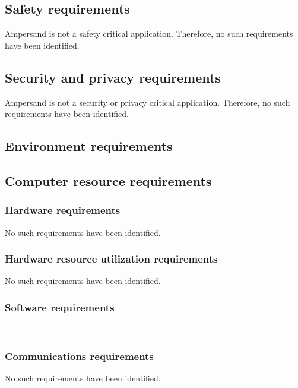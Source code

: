 \subsection{Safety requirements}
Ampersand is not a safety critical application.
Therefore, no such requirements have been identified.

\subsection{Security and privacy requirements}
Ampersand is not a security or privacy critical application.
Therefore, no such requirements have been identified.

\subsection{Environment requirements}

\subsection{Computer resource requirements}
	\subsubsection{Hardware requirements}
	No such requirements have been identified.

	\subsubsection{Hardware resource utilization requirements}
	No such requirements have been identified.

	\subsubsection{Software requirements}
	\\
		

	\subsubsection{Communications requirements}
	No such requirements have been identified.

